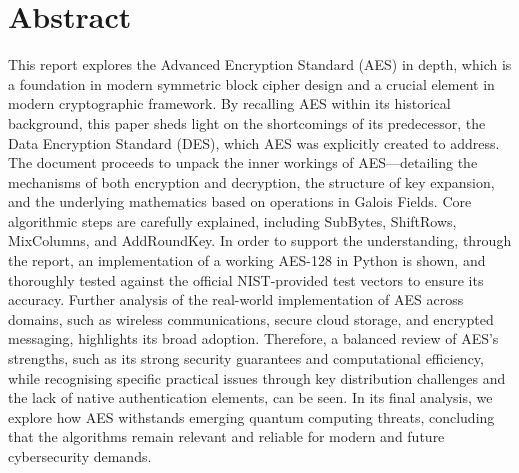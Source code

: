 \section*{Abstract} %

This report explores the Advanced Encryption Standard (AES) in depth, 
which is a foundation in modern symmetric block cipher design and a crucial element in modern cryptographic framework. By recalling AES within its historical background, this paper sheds light on the shortcomings of its predecessor, the Data Encryption Standard (DES), which AES was explicitly created to address. 
The document proceeds to unpack the inner workings of AES—detailing the mechanisms of both encryption and decryption, 
the structure of key expansion, 
and the underlying mathematics based on operations in Galois Fields. 
Core algorithmic steps are carefully explained, 
including SubBytes, ShiftRows, MixColumns, and AddRoundKey. 
In order to support the understanding, through the report, an implementation of a working AES-128 in Python is shown, 
and thoroughly tested against the official NIST-provided test vectors to ensure its accuracy.
Further analysis of the real-world implementation of AES across domains, such as wireless communications, secure cloud storage, and encrypted messaging, highlights its broad adoption. 
Therefore, a balanced review of AES's strengths, 
such as its strong security guarantees and computational efficiency, 
while recognising specific practical issues through key distribution challenges and the lack of native authentication elements, can be seen. 
In its final analysis, we explore how AES withstands emerging quantum computing threats, 
concluding that the algorithms remain relevant and reliable for modern and future cybersecurity demands.